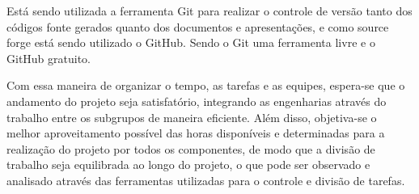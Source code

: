 Está sendo utilizada a ferramenta Git para realizar o controle de versão tanto dos códigos fonte gerados quanto dos documentos e apresentações, e como source
forge está sendo utilizado o GitHub. Sendo o Git uma ferramenta livre e o GitHub gratuito.

Com essa maneira de organizar o tempo, as tarefas e as equipes, espera-se que o andamento do projeto seja satisfatório, integrando as engenharias através do 
trabalho entre os subgrupos de maneira eficiente. Além disso, objetiva-se o melhor aproveitamento possível das horas disponíveis e determinadas para a realização 
do projeto por todos os componentes, de modo que a divisão de trabalho seja equilibrada ao longo do projeto, o que pode ser observado e analisado através das 
ferramentas utilizadas para o controle e divisão de tarefas.

